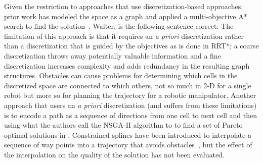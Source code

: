 \documentclass[conference]{IEEEtran}
\begin{document}
Given the restriction to approaches that use discretization-based approaches, prior work has modeled the space as a graph and applied a multi-objective A* search to find the solution~\cite{Mandow:2005:NAM:1642293.1642328}. 
{Walter, is the following sentence correct: The limitation of this approach is that it requires an {\em a priori} discretization rather than a discretization that is guided by the objectives as is done in RRT*; a coarse discretization throws away potentially valuable information and a fine discretization increases complexity and adds redundancy in the resulting graph structures.}  
Obstacles can cause problems for determining which cells in the discretized space are connected to which others, not so much in 2-D for a single robot but more so for planning the trajectory for a robotic manipulator.
Another approach that users an {\em a priori} discretization (and suffers from these limitations) is to encode a path as a sequence of directions from one cell to next cell and then using what the authors call the NSGA-II algorithm to to find a set of Pareto optimal solutions in \cite{Ahmed2013}.  
Constrained splines have been introduced to interpolate a sequence of way points into a trajectory that avoids obstacles~\cite{6181426}, but the effect of the interpolation on the quality of the solution has not been evaluated.

\end{document}

